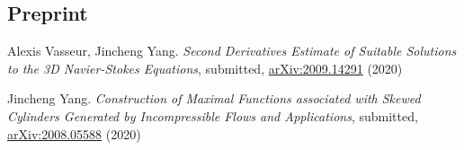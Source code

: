 \documentclass[margin,line]{res}
\newenvironment{list2}{
  \begin{list}{$\bullet$}{%
      \setlength{\itemsep}{0in}
      \setlength{\parsep}{0in} \setlength{\parskip}{0in}
      \setlength{\topsep}{0in} \setlength{\partopsep}{0in} 
      \setlength{\leftmargin}{0.2in}}}{\end{list}}
\begin{document}
\begin{resume}
\section{\sc Preprint}

\begin{etaremune}[leftmargin=0.02in, start=2]
    \item Alexis Vasseur, Jincheng Yang. \textit{Second Derivatives Estimate of Suitable Solutions to the 3D Navier-Stokes Equations}, submitted, \href{https://arxiv.org/abs/2009.14291}{arXiv:2009.14291} (2020) 
    \item Jincheng Yang. \textit{Construction of Maximal Functions associated with Skewed Cylinders Generated by Incompressible Flows and Applications}, submitted, \href{https://arxiv.org/abs/2008.05588}{arXiv:2008.05588} (2020)
\end{etaremune}



\end{resume}
\end{document}
